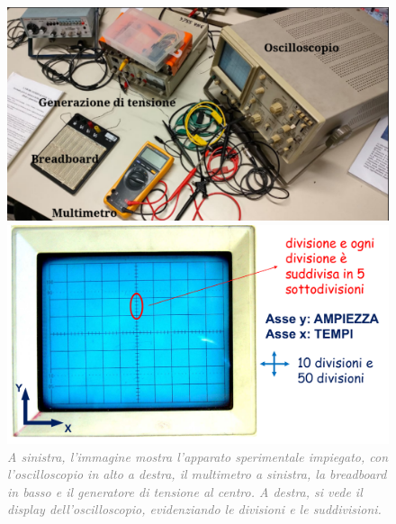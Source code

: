 \documentclass[a4paper,11pt]{article}
\begin{document}
\begin{figure}[ht]
    \centering
    \begin{minipage}{0.45\textwidth}
        \includegraphics[width=\textwidth]{pictures/apparato.png}
    \end{minipage}%
    \hfill
    \begin{minipage}{0.45\textwidth}
        \includegraphics[width=\textwidth]{pictures/oscilloscopio.png}
    \end{minipage}
    \caption{\textit{\textcolor{gray}{A sinistra, l'immagine mostra l'apparato sperimentale impiegato, con l'oscilloscopio in alto a destra, il multimetro a sinistra, la breadboard in basso e il generatore di tensione al centro. A destra, si vede il display dell'oscilloscopio, evidenziando le divisioni e le suddivisioni.}}}
    \label{fig::apparato}
\end{figure}
\end{document}
